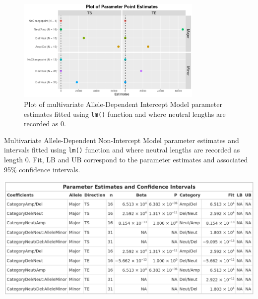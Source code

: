 \begin{figure}[!h]
\centering
\includegraphics[width = 0.8\textwidth]{../figures/Chapter_5/Multivariate_lm_7_AD_Interval.png}
 
\caption[Plot of multivariate Allele-Dependent Intercept Model parameter estimates fitted using \texttt{lm()} function.]{Plot of multivariate Allele-Dependent Intercept Model parameter estimates fitted using \texttt{lm()} function and where neutral lengths are recorded as 0. }
\label{fig:lm_multi_AD_modpred}
\end{figure}

\begin{table}[!h]
\centering
\caption[Multivariate Allele-Dependent Non-Intercept Model parameter estimates and intervals fitted using \texttt{lm()} function.]{Multivariate Allele-Dependent Non-Intercept Model parameter estimates and intervals fitted using \texttt{lm()} function and where neutral lengths are recorded as length 0. Fit, LB and UB correspond to the parameter estimates and associated 95\% confidence intervals. }

\includegraphics[width = 1\textwidth]{../tables/Chapter_5/Multivariate_lm_6_AD_Model_Pred.png}
\label{tab:lm_multi_AD_modpred_6}
\end{table}
\clearpage

